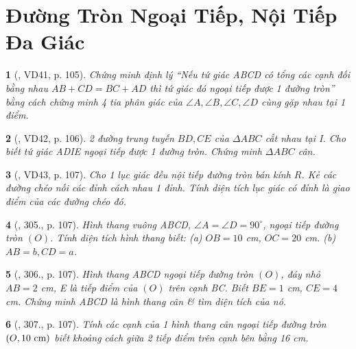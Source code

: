 \documentclass{article}
\newtheorem{baitoan}{}
\begin{document}

\section{Đường Tròn Ngoại Tiếp, Nội Tiếp Đa Giác}

\begin{baitoan}[\cite{Binh_Toan_9_tap_2}, VD41, p. 105]
	Chứng minh định lý ``Nếu tứ giác ABCD có tổng các cạnh đối bằng nhau $AB + CD = BC + AD$ thì tứ giác đó ngoại tiếp được 1 đường tròn'' bằng cách chứng minh 4 tia phân giác của $\angle{A},\angle{B},\angle{C},\angle{D}$ cùng gặp nhau tại 1 điểm.
\end{baitoan}

\begin{baitoan}[\cite{Binh_Toan_9_tap_2}, VD42, p. 106]
	2 đường trung tuyến $BD,CE$ của $\Delta ABC$ cắt nhau tại I. Cho biết tứ giác ADIE ngoại tiếp được 1 đường tròn. Chứng minh $\Delta ABC$ cân.
\end{baitoan}

\begin{baitoan}[\cite{Binh_Toan_9_tap_2}, VD43, p. 107]
	Cho 1 lục giác đều nội tiếp đường tròn bán kính $R$. Kẻ các đường chéo nối các đỉnh cách nhau 1 đỉnh. Tính diện tích lục giác có đỉnh là giao điểm của các đường chéo đó.
\end{baitoan}

\begin{baitoan}[\cite{Binh_Toan_9_tap_2}, 305., p. 107]
	Hình thang vuông ABCD, $\angle{A} = \angle{D} = 90^\circ$, ngoại tiếp đường tròn $(O)$. Tính diện tích hình thang biết: (a) $OB = 10$ {\rm cm}, $OC = 20$ {\rm cm}. (b) $AB = b,CD = a$.
\end{baitoan}

\begin{baitoan}[\cite{Binh_Toan_9_tap_2}, 306., p. 107]
	Hình thang ABCD ngoại tiếp đường tròn $(O)$, đáy nhỏ $AB = 2$ {\rm cm}, E là tiếp điểm của $(O)$ trên cạnh BC. Biết $BE = 1$ {\rm cm}, $CE = 4$ {\rm cm}. Chứng minh ABCD là hình thang cân \& tìm diện tích của nó.
\end{baitoan}

\begin{baitoan}[\cite{Binh_Toan_9_tap_2}, 307., p. 107]
	Tính các cạnh của 1 hình thang cân ngoại tiếp đường tròn $(O,10\ {\rm cm})$ biết khoảng cách giữa 2 tiếp điểm trên cạnh bên bằng {\rm16 cm}.
\end{baitoan}
\end{document}
